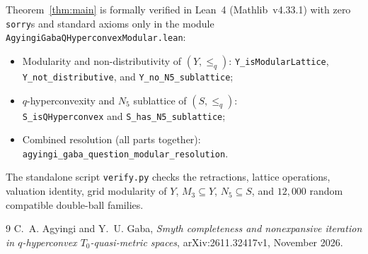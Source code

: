 \documentclass[11pt]{article}
\begin{document}
Theorem~\ref{thm:main} is formally verified in Lean~4 (Mathlib~v4.33.1) with
zero \texttt{sorry}s and standard axioms only in the module
\texttt{AgyingiGabaQHyperconvexModular.lean}:
\begin{itemize}
  \item Modularity and non-distributivity of $(Y, \le_q)$:
        \texttt{Y\_isModularLattice}, \texttt{Y\_not\_distributive}, and
        \texttt{Y\_no\_N5\_sublattice};
  \item $q$-hyperconvexity and $N_5$ sublattice of $(S, \le_q)$:\\
        \texttt{S\_isQHyperconvex} and \texttt{S\_has\_N5\_sublattice};
  \item Combined resolution (all parts together):\\
        \texttt{agyingi\_gaba\_question\_modular\_resolution}.
\end{itemize}
The standalone script \texttt{verify.py} checks the retractions, lattice
operations, valuation identity, grid modularity of $Y$, $M_3 \subseteq Y$,
$N_5 \subseteq S$, and $12{,}000$ random compatible double-ball families.

\begin{thebibliography}{9}
C.~A. Agyingi and Y.~U. Gaba,
\emph{Smyth completeness and nonexpansive iteration in $q$-hyperconvex
$T_0$-quasi-metric spaces},
arXiv:2611.32417v1, November 2026.
\end{thebibliography}
\end{document}
